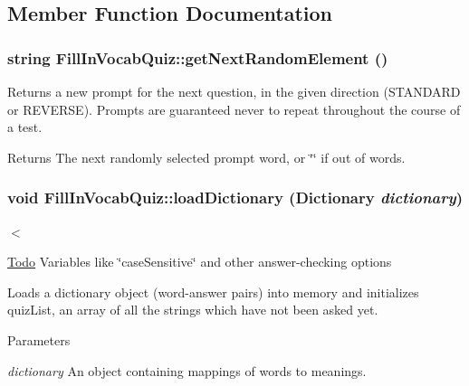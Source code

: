 \subsection{Member Function Documentation}
\hypertarget{classFillInVocabQuiz_a551b818f3b29e9c72e44cc9c0ba1c4cb}{
\subsubsection[{getNextRandomElement}]{\setlength{\rightskip}{0pt plus 5cm}string FillInVocabQuiz::getNextRandomElement ()}}
\label{classFillInVocabQuiz_a551b818f3b29e9c72e44cc9c0ba1c4cb}
Returns a new prompt for the next question, in the given direction (STANDARD or REVERSE). Prompts are guaranteed never to repeat throughout the course of a test. \begin{DoxyReturn}{Returns}
The next randomly selected prompt word, or \char`\"{}\char`\"{} if out of words. 
\end{DoxyReturn}
\hypertarget{classFillInVocabQuiz_affe1c2da58f58e96643a5d95bf3a6e47}{
\subsubsection[{loadDictionary}]{\setlength{\rightskip}{0pt plus 5cm}void FillInVocabQuiz::loadDictionary ({\bf Dictionary} {\em dictionary})}}
\label{classFillInVocabQuiz_affe1c2da58f58e96643a5d95bf3a6e47}


$<$ 

\begin{Desc}
\item[\hyperlink{todo__todo000007}{Todo}]Variables like \char`\"{}caseSensitive\char`\"{} and other answer-\/checking options \end{Desc}


Loads a dictionary object (word-\/answer pairs) into memory and initializes quizList, an array of all the strings which have not been asked yet. 
\begin{DoxyParams}{Parameters}
\item[{\em dictionary}]An object containing mappings of words to meanings. \end{DoxyParams}


